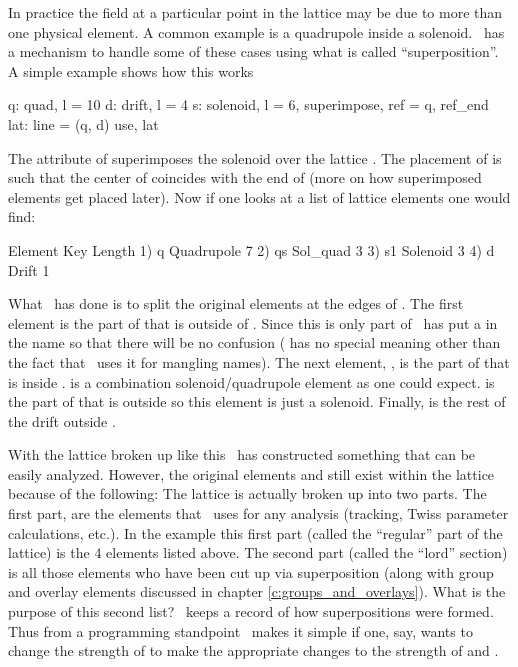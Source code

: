 In practice the field at a particular point in the lattice may be due
to more than one physical element. A common example is a quadrupole
inside a solenoid. \bmad\ has a mechanism to handle some of these
cases using what is called ``superposition''. A simple example shows
how this works
\begin{example}
  q: quad, l = 10
  d: drift, l = 4
  s: solenoid, l = 6, superimpose, ref = q, ref_end
  lat: line = (q, d)
  use, lat
\end{example}
The  attribute of  superimposes the 
solenoid over the lattice . The placement of  is such
that the center of  coincides with the end of  (more on
how superimposed elements get placed later). Now if one looks at a
list of lattice elements one would find:
\begin{example}
        Element   Key         Length
  1)    q{\B}        Quadrupole  7
  2)    q{\B}s       Sol_quad    3
  3)    s{\B}1       Solenoid    3
  4)    d{\B}        Drift       1
\end{example}
What \bmad\ has done is to split the original elements  at
the edges of .  The first element  is the part of 
that is outside of . Since this is only part of  \bmad\
has put a \vn{\B} in the name so that there will be no confusion
(\vn{\B} has no special meaning other than the fact that \bmad\ uses
it for mangling names). The next element, , is the part of
\vn{q} that is inside . \vn{q{\B}s} is a combination
solenoid/quadrupole element as one could expect.  is the part
of \vn{s} that is outside \vn{q} so this element is just a
solenoid. Finally,  is the rest of the drift outside .

With the lattice broken up like this \bmad\ has constructed something
that can be easily analyzed. However, the original elements \vn{q} and
\vn{s} still exist within the lattice because of the following: The
lattice is actually broken up into two parts. The first part, are the
elements that \bmad\ uses for any analysis (tracking, Twiss parameter
calculations, etc.).  In the example this first part (called the
``regular'' part of the lattice) is the 4 elements listed above. The
second part (called the ``lord'' section) is all those elements who
have been cut up via superposition (along with group and overlay
elements discussed in chapter \ref{c:groups_and_overlays}). What is
the purpose of this second list? \bmad\ keeps a record of how
superpositions were formed. Thus from a programming standpoint \bmad\
makes it simple if one, say, wants to change the  strength of
\vn{q} to make the appropriate changes to the \vn{k1} strength of
\vn{q\B} and \vn{q{\B}s}.

